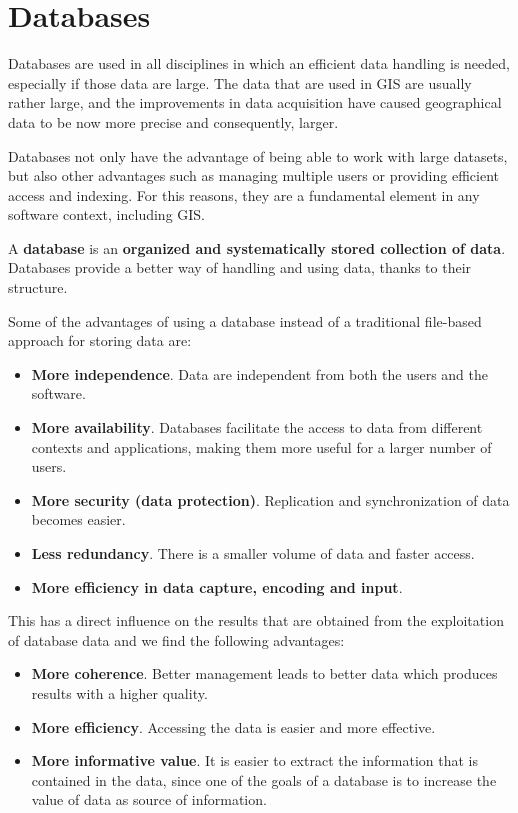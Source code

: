 \chapter{Databases}

\pagestyle{fancy}

Databases are used in all disciplines in which an efficient data handling is needed, especially if those data are large. The data that are used in GIS are usually rather large, and the improvements in data acquisition have caused geographical data to be now more precise and consequently, larger. 

Databases not only have the advantage of being able to work with large datasets, but also other advantages such as managing multiple users or providing efficient access and indexing. For this reasons, they are a fundamental element in any software context, including GIS.

A \textbf{database} is an \textbf{organized and systematically stored collection of data}. Databases provide a better way of handling and using data, thanks to their structure.

Some of the advantages of using a database instead of a traditional file-based approach for storing data are:

\begin{itemize}
	\item \textbf{More independence}. Data are independent from both the users and the software.
	\item \textbf{More availability}. Databases facilitate the access to data from different contexts and applications, making them more useful for a larger number of users.
	\item \textbf{More security (data protection)}. Replication and synchronization of data becomes easier.
	\item \textbf{Less redundancy}. There is a smaller volume of data and faster access.
	\item \textbf{More efficiency in data capture, encoding and input}.
\end{itemize}

This has a direct influence on the results that are obtained from the exploitation of database data and we find the following advantages:

\begin{itemize}
	\item \textbf{More coherence}. Better management leads to better data which produces results with a higher quality.
	\item \textbf{More efficiency}. Accessing the data is easier and more effective.
	\item \textbf{More informative value}. It is easier to extract the information that is contained in the data, since one of the goals of a database is to increase the value of data as source of information.
\end{itemize}

